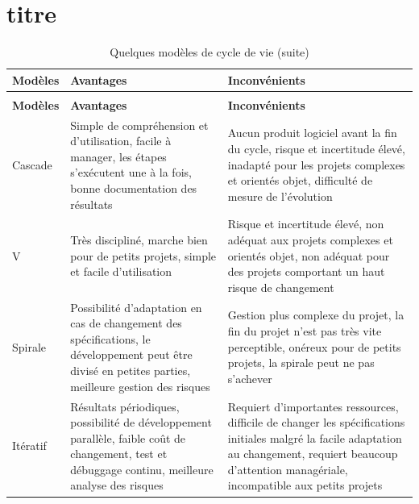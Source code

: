 \chapter{titre}


\begin{center}
	\begin{longtable}{|p{}|p{}|p{}|}
		\caption{Quelques modèles de cycle de vie} 
		\label{modeles-cycle-vie}
		\\
		
		
		\hline 
		\textbf{Modèles} & 
		\textbf{Avantages} &
		\textbf{Inconvénients}
		\\
		
		
		\endfirsthead
		\caption[]{Quelques modèles de cycle de vie (suite)} 
		\\
		\hline 
		\textbf{Modèles} & 
		\textbf{Avantages} &
		\textbf{Inconvénients}
		\\
		\hline
		\endhead
		\hline
		\endfoot
		\hline
		
		
		\hline
		Cascade &  
		Simple  de  compréhension  et d’utilisation, facile à manager, les étapes s’exécutent une à la fois, bonne documentation des résultats &
		Aucun produit logiciel avant la fin du cycle, risque et incertitude élevé, inadapté pour les projets complexes et orientés objet, difficulté de mesure de l’évolution
		\\ 
		
		\hline
		V &  
		Très discipliné, marche bien pour de petits projets, simple et facile d’utilisation &
		Risque et incertitude élevé, non adéquat aux projets complexes et orientés objet, non adéquat pour des projets comportant un haut risque de changement
		\\  
		
		\hline
		Spirale &  
		Possibilité d’adaptation en cas de changement des spécifications, le développement peut être divisé en petites parties, meilleure gestion des risques &
		Gestion plus complexe du projet, la fin du projet n’est pas très vite perceptible, onéreux pour de petits projets, la spirale peut ne pas s’achever
		\\  
		
		\hline
		Itératif &  
		Résultats  périodiques,  possibilité de développement parallèle, faible coût de changement, test et débuggage continu, meilleure analyse des risques &
		Requiert   d’importantes   ressources, difficile de changer les spécifications initiales malgré la facile adaptation au changement, requiert  beaucoup  d’attention managériale, incompatible aux petits projets
		\\  
		

\end{longtable}
\end{center}
